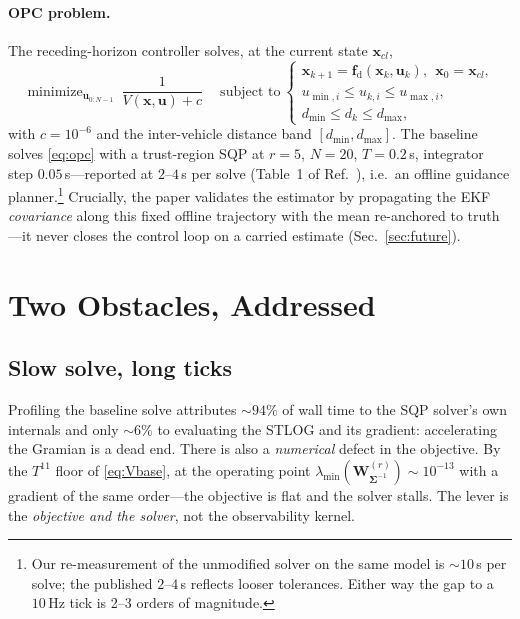 \documentclass[11pt]{article}
\newcommand{\xcl}{\bm{x}_{cl}}
\DeclareMathOperator*{\minimize}{minimize}
\newcommand{\st}{\ \text{subject to}\ }
\newcommand{\Wstlog}{\bm{W}^{(r)}_{\bm{\Sigma}^{-1}}}
\begin{document}
\paragraph{OPC problem.} The receding-horizon controller solves, at the current state $\xcl$,
\begin{equation}\label{eq:opc}
  \minimize_{\bm{u}_{0:N-1}}\ \frac{1}{V(\bm{x},\bm{u}) + c}
  \quad\st
  \begin{cases}
    \bm{x}_{k+1} = \bm{f}_{\mathrm d}(\bm{x}_k,\bm{u}_k),\ \ \bm{x}_0 = \xcl,\\
    u_{\min,i} \le u_{k,i} \le u_{\max,i},\\
    d_{\min} \le d_k \le d_{\max},
  \end{cases}
\end{equation}
with $c=10^{-6}$ and the inter-vehicle distance band $[d_{\min},d_{\max}]$. The baseline solves
\eqref{eq:opc} with a trust-region SQP at $r=5$, $N=20$, $T=0.2$\,s, integrator step $0.05$\,s---reported
at $2$--$4$\,s per solve (Table~1 of Ref.~\cite{jgcd}), i.e.\ an offline guidance
planner.\footnote{Our re-measurement of the unmodified solver on the same model is $\sim\!10$\,s
per solve; the published $2$--$4$\,s reflects looser tolerances. Either way the gap to a $10$\,Hz
tick is 2--3 orders of magnitude.} Crucially, the paper validates the estimator by propagating the
EKF \emph{covariance} along this fixed offline trajectory with the mean re-anchored to truth---it
never closes the control loop on a carried estimate (Sec.~\ref{sec:future}).

\section{Two Obstacles, Addressed}\label{sec:problems}

\subsection{Slow solve, long ticks}\label{sub:p1}
Profiling the baseline solve attributes $\sim\!94\%$ of wall time to the SQP solver's own
internals and only $\sim\!6\%$ to evaluating the STLOG and its gradient: accelerating the Gramian
is a dead end. There is also a \emph{numerical} defect in the objective. By the $T^{11}$ floor of
\eqref{eq:Vbase}, at the operating point $\lambda_{\min}(\Wstlog)\sim10^{-13}$ with a gradient of
the same order---the objective is flat and the solver stalls. The lever is the \emph{objective and
the solver}, not the observability kernel.
\end{document}
